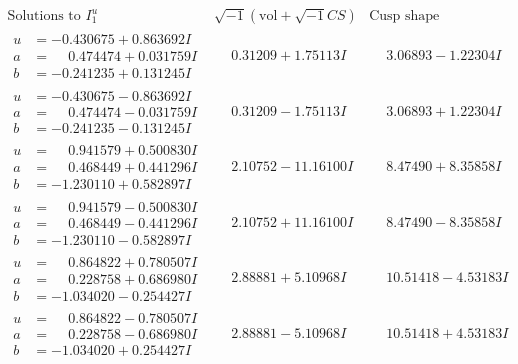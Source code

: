\documentclass[1p]{elsarticle_modified}
\theoremstyle{definition}
\newcommand{\I}{\sqrt{-1}}
\begin{document}
$$\begin{array}{c|c|c}  
\text{Solutions to }I^u_{1}& \I (\text{vol} + \sqrt{-1}CS) & \text{Cusp shape}\\
 \hline 
\begin{aligned}
u &= -0.430675 + 0.863692 I \\
a &= \phantom{-}0.474474 + 0.031759 I \\
b &= -0.241235 + 0.131245 I\end{aligned}
 & \phantom{-}0.31209 + 1.75113 I & \phantom{-}3.06893 - 1.22304 I \\ \hline\begin{aligned}
u &= -0.430675 - 0.863692 I \\
a &= \phantom{-}0.474474 - 0.031759 I \\
b &= -0.241235 - 0.131245 I\end{aligned}
 & \phantom{-}0.31209 - 1.75113 I & \phantom{-}3.06893 + 1.22304 I \\ \hline\begin{aligned}
u &= \phantom{-}0.941579 + 0.500830 I \\
a &= \phantom{-}0.468449 + 0.441296 I \\
b &= -1.230110 + 0.582897 I\end{aligned}
 & \phantom{-}2.10752 - 11.16100 I & \phantom{-}8.47490 + 8.35858 I \\ \hline\begin{aligned}
u &= \phantom{-}0.941579 - 0.500830 I \\
a &= \phantom{-}0.468449 - 0.441296 I \\
b &= -1.230110 - 0.582897 I\end{aligned}
 & \phantom{-}2.10752 + 11.16100 I & \phantom{-}8.47490 - 8.35858 I \\ \hline\begin{aligned}
u &= \phantom{-}0.864822 + 0.780507 I \\
a &= \phantom{-}0.228758 + 0.686980 I \\
b &= -1.034020 - 0.254427 I\end{aligned}
 & \phantom{-}2.88881 + 5.10968 I & \phantom{-}10.51418 - 4.53183 I \\ \hline\begin{aligned}
u &= \phantom{-}0.864822 - 0.780507 I \\
a &= \phantom{-}0.228758 - 0.686980 I \\
b &= -1.034020 + 0.254427 I\end{aligned}
 & \phantom{-}2.88881 - 5.10968 I & \phantom{-}10.51418 + 4.53183 I \\ \hline\begin{aligned}

\end{aligned}
\end{array}$$
\end{document}
